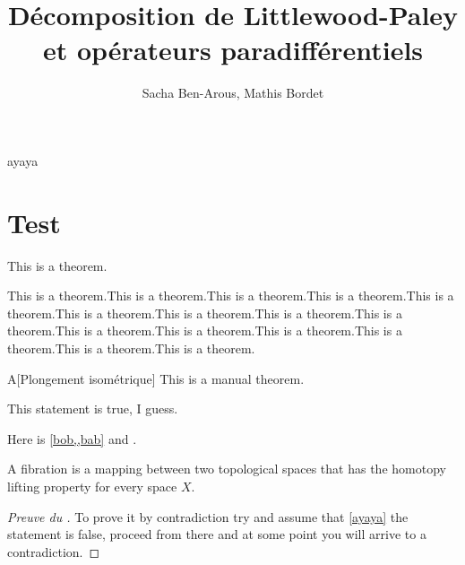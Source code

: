 \documentclass[11pt,a4paper]{article}
\title{\textbf{Décomposition de Littlewood-Paley et opérateurs paradifférentiels}}
\date{}
\author{Sacha Ben-Arous, Mathis Bordet}
\begin{document}
\maketitle
ayaya

\section{Test}

\begin{thm}\label{bob}
This is a theorem.
\end{thm}

\begin{lemma}\label{bab}
This is a theorem.This is a theorem.This is a theorem.This is a theorem.This is a theorem.This is a theorem.This is a theorem.This is a theorem.This is a theorem.This is a theorem.This is a theorem.This is a theorem.This is a theorem.This is a theorem.This is a theorem.
\end{lemma}

\begin{mth}{A}[Plongement isométrique]\label{foo}
This is a manual theorem.
\end{mth}

\begin{rmq}
This statement is true, I guess.
\end{rmq}

Here is \cref{bob,,bab} and .

\begin{defin}[Fibration]\label{ayaya}
A fibration is a mapping between two topological spaces that has the homotopy lifting property for every space \(X\).
\end{defin}

\begin{proof}[Preuve du ]
To prove it by contradiction try and assume that \cref{ayaya} the statement is false,
proceed from there and at some point you will arrive to a contradiction.
\end{proof}
\end{document}
